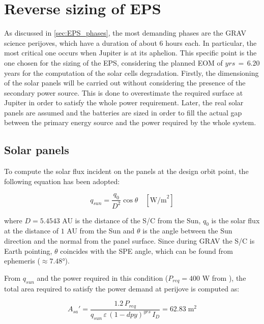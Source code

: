 \section{Reverse sizing of EPS}
\label{sec:EPS_sizing}

As discussed in \autoref{sec:EPS_phases}, the most demanding phases are the GRAV science perijoves, which have a duration of about 6 hours each. In particular, the most critical one occurs when Jupiter is at its aphelion.
This specific point is the one chosen for the sizing of the EPS, considering the planned EOM of $yrs \, = \, 6.20$ years for the computation of the solar cells degradation.
Firstly, the dimensioning of the solar panels will be carried out without considering the presence of the secondary power source.
This is done to overestimate the required surface at Jupiter in order to satisfy the whole power requirement.
Later, the real solar panels are assumed and the batteries are sized in order to fill the actual gap between the primary energy source and the power required by the whole system. 


\subsection{Solar panels}
\label{subsec:solar_panels_sizing}

To compute the solar flux incident on the panels at the design orbit point, the following equation has been adopted:

\begin{equation}
    q_{sun} = \frac{q_0}{D^2} \cos \theta \quad [ \textrm{W/m}^2 ]
\end{equation}

where $D = 5.4543$ AU is the distance of the S/C from the Sun, $q_0$ is the solar flux at the distance of $1$ AU from the Sun and $\theta$ is the angle between the Sun direction and the normal from the panel surface.
Since during GRAV the S/C is Earth pointing, $\theta$ coincides with the SPE angle, which can be found from ephemeris ($\approx 7.48$°).

From $q_{sun}$ and the power required in this condition ($P_{req} = 400$ W from \mref), the total area required to satisfy the power demand at perijove is computed as:

\begin{equation}
    A_{sa}' = \frac{1.2 \, P_{req}}{q_{sun} \, \varepsilon \, \left( 1 - dpy \right) ^ {yrs} \, I_D} = 62.83 \; \textrm{m}^2
    \label{eq:A_sa}
\end{equation}

